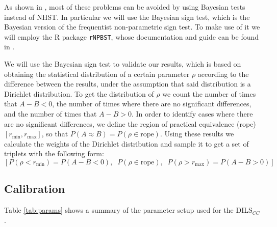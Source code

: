\documentclass[review]{elsarticle}
\begin{document}
As shown in \cite{benavoli2017time}, most of these problems can be avoided by using Bayesian tests instead of NHST. In particular we will use the Bayesian sign test, which is the Bayesian version of the frequentist non-parametric sign test. To make use of it we will employ the R package \texttt{rNPBST}, whose documentation and guide can be found in \cite{carrasco2017rnpbst}.

We will use the Bayesian sign test to validate our results, which is based on obtaining the statistical distribution of a certain parameter $\rho$ according to the difference between the results, under the assumption that said distribution is a Dirichlet distribution. To get the distribution of $\rho$ we count the number of times that $A - B < 0$, the number of times where there are no significant differences, and the number of times that $A - B > 0$. In order to identify cases where there are no significant differences, we define the region of practical equivalence (rope) $[r_\text{min}, r_\text{max}]$, so that $P(A \approx B) = P(\rho \in \text{rope})$. Using these results we calculate the weights of the Dirichlet distribution and sample it to get a set of triplets with the following form: 
$$[P(\rho < r_\text{min}) = P(A - B < 0),\;\; P(\rho \in \text{rope}),\;\; P(\rho > r_\text{max}) = P(A - B > 0)]$$

\subsection{Calibration}

Table \ref{tab:params} shows a summary of the parameter setup used for the DILS$_{CC}$.

\begin{table}[!h]
	\centering
	\setlength{\tabcolsep}{7pt}
	\renewcommand{\arraystretch}{1.4}

	\caption{Parameters setup used for DILS$_{CC}$.}
	\label{tab:params}
\end{table}
\end{document}
